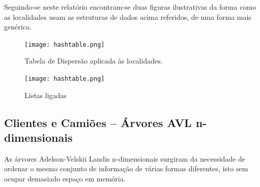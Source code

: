 \documentclass[a5paper,twocolumn, 11pt]{article}
\def\hyph{-\penalty0\hskip0pt\relax}
\begin{document}
Seguindo-se neste relatório encontram-se duas figuras ilustrativas da forma como as localidades usam as estruturas de dados acima referidos, de uma forma mais genérica.

\clearpage
\onecolumn
\begin{figure}[hbt]
    \caption[Tabela de Dispersão]{Tabela de Dispersão aplicada às localidades.}
    \label{hashtable}
    \centering
        \texttt{[image: hashtable.png]}
\end{figure}
\begin{figure}[tbt]
    \caption[Listas Ligadas]{Listas ligadas}
    \label{linkedlist}
    \centering
        \texttt{[image: hashtable.png]}
\end{figure}

\clearpage

\twocolumn
\subsection[Clientes e Camiões]{Clientes e Camiões -- Árvores AVL n\hyph{}dimensionais}
As árvores Adelson-Velskii Landis n\hyph{}dimensionais surgiram da necessidade de ordenar o mesmo conjunto de informação de várias formas diferentes, isto sem ocupar demasiado espaço em memória.
\end{document}
